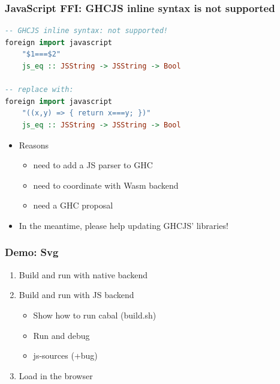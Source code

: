 \documentclass[aspectratio=169]{beamer}
\begin{document}
%
%
%
%


\begin{frame}[fragile]
\frametitle{JavaScript FFI: GHCJS inline syntax is not supported}

\begin{lstlisting}[language=haskell]
-- GHCJS inline syntax: not supported!
foreign import javascript
    "$1===$2"
    js_eq :: JSString -> JSString -> Bool

-- replace with:
foreign import javascript
    "((x,y) => { return x===y; })"
    js_eq :: JSString -> JSString -> Bool

\end{lstlisting}

  \begin{itemize}
    \item Reasons
      \begin{itemize}
        \item need to add a JS parser to GHC
        \item need to coordinate with Wasm backend
        \item need a GHC proposal
      \end{itemize}
    \item In the meantime, please help updating GHCJS' libraries!
  \end{itemize}

\end{frame}

\begin{frame}
\frametitle{Demo: Svg}
  \begin{enumerate}
    \item Build and run with native backend
    \item Build and run with JS backend
      \begin{itemize}
        \item Show how to run cabal (build.sh)
        \item Run and debug
        \item js-sources (+bug)
      \end{itemize}
    \item Load in the browser
  \end{enumerate}
\end{frame}
\end{document}

